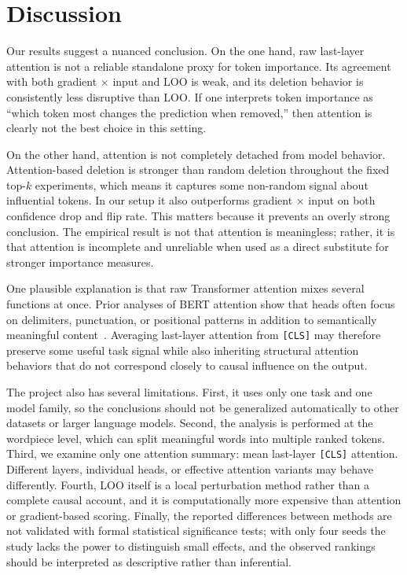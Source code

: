\section{Discussion}
\label{sec:discussion}

Our results suggest a nuanced conclusion. On the one hand, raw last-layer attention is not a reliable standalone proxy for token importance. Its agreement with both gradient $\times$ input and LOO is weak, and its deletion behavior is consistently less disruptive than LOO. If one interprets token importance as ``which token most changes the prediction when removed,'' then attention is clearly not the best choice in this setting.

On the other hand, attention is not completely detached from model behavior. Attention-based deletion is stronger than random deletion throughout the fixed top-$k$ experiments, which means it captures some non-random signal about influential tokens. In our setup it also outperforms gradient $\times$ input on both confidence drop and flip rate. This matters because it prevents an overly strong conclusion. The empirical result is not that attention is meaningless; rather, it is that attention is incomplete and unreliable when used as a direct substitute for stronger importance measures.

One plausible explanation is that raw Transformer attention mixes several functions at once. Prior analyses of BERT attention show that heads often focus on delimiters, punctuation, or positional patterns in addition to semantically meaningful content~\cite{clark2019bert,sun2021effective}. Averaging last-layer attention from \texttt{[CLS]} may therefore preserve some useful task signal while also inheriting structural attention behaviors that do not correspond closely to causal influence on the output.

The project also has several limitations. First, it uses only one task and one model family, so the conclusions should not be generalized automatically to other datasets or larger language models. Second, the analysis is performed at the wordpiece level, which can split meaningful words into multiple ranked tokens. Third, we examine only one attention summary: mean last-layer \texttt{[CLS]} attention. Different layers, individual heads, or effective attention variants may behave differently. Fourth, LOO itself is a local perturbation method rather than a complete causal account, and it is computationally more expensive than attention or gradient-based scoring. Finally, the reported differences between methods are not validated with formal statistical significance tests; with only four seeds the study lacks the power to distinguish small effects, and the observed rankings should be interpreted as descriptive rather than inferential.
